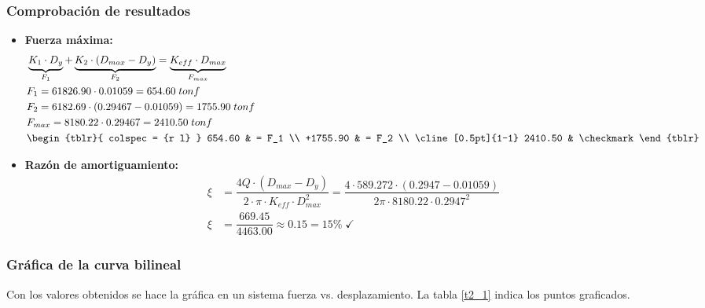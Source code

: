\subsubsection{Comprobación de resultados}
\begin{itemize}
    \item \textbf{Fuerza máxima:}
    \begin{align*}
        &\underbrace{K_1 \cdot D_y}_{F_1} + \underbrace{K_2 \cdot (D_{max} - D_y)}_{F_2} = \underbrace{K_{eff} \cdot D_{max}}_{F_{max}} \\
        &F_1 = 61826.90 \cdot 0.01059 = 654.60 \; tonf \\ 
        &F_2 = 6182.69 \cdot (0.29467 - 0.01059) = 1755.90 \; tonf \\ 
        &F_{max} = 8180.22 \cdot 0.29467 = 2410.50 \; tonf \\
        &\begin{tblr}{
            colspec = {r l}
        }
            654.60 & = F_1 \\
            +1755.90 & = F_2 \\
            \cline[0.5pt]{1-1}
            2410.50 & \checkmark 
        \end{tblr}
    \end{align*}
    
    \item \textbf{Razón de amortiguamiento:}
    \begin{align*}
        \xi &= \dfrac{4Q \cdot (D_{max} - D_y)}{2 \cdot \pi \cdot K_{eff} \cdot D_{max}^2} = \dfrac{4 \cdot 589.272 \cdot (0.2947 - 0.01059)}{2 \pi \cdot 8180.22 \cdot 0.2947^2} \\
        \xi &= \dfrac{669.45}{4463.00} \approx 0.15 = 15\% \; \checkmark
    \end{align*}
\end{itemize}

\subsubsection{Gráfica de la curva bilineal}
Con los valores obtenidos se hace la gráfica en un sistema fuerza vs. desplazamiento. La tabla \ref{t2_1} indica los puntos graficados.

